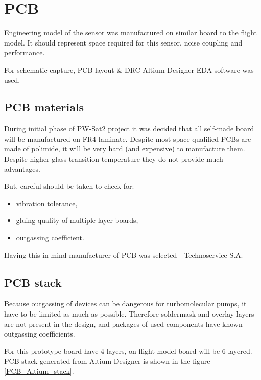 \section{PCB}
    Engineering model of the sensor was manufactured on similar board to the flight model. It should represent space required for this sensor, noise coupling and performance.

    For schematic capture, PCB layout \& DRC Altium Designer EDA software was used.

    \subsection{PCB materials}
        During initial phase of PW-Sat2 project it was decided that all self-made board will be manufactured on FR4 laminate. Despite most space-qualified PCBs are made of polimide, it will be very hard (and expensive) to manufacture them. Despite higher glass transition temperature they do not provide much advantages.

        But, careful should be taken to check for:
        \begin{itemize}
            \item vibration tolerance,
            \item gluing quality of multiple layer boards,
            \item outgassing coefficient.
        \end{itemize}

        Having this in mind manufacturer of PCB was selected - Technoservice S.A.

    \subsection{PCB stack}
        Because outgassing of devices can be dangerous for turbomolecular pumps, it have to be limited as much as possible. Therefore soldermask and overlay layers are not present in the design, and packages of used components have known outgassing coefficients.

        For this prototype board have 4 layers, on flight model board will be 6-layered. PCB stack generated from Altium Designer is shown in the figure \ref{PCB_Altium_stack}.

